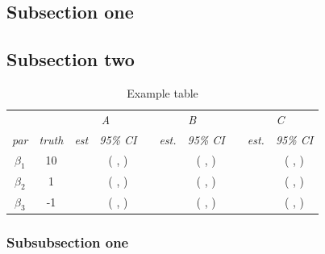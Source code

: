 \documentclass[12pt]{article}
\begin{document}
\subsection{Subsection one}\label{sec:subsimulation1}


\subsection{Subsection two}\label{sec:subsimulation2}

\begin{table}[H]
\begin{center}
\caption{Example table}
\begin{tabular}{cccccccccc}
\hline
&  & \multicolumn{2}{c}{\emph{A}} && \multicolumn{2}{c}{\emph{B}} & &\multicolumn{2}{c}{\emph{C}} \\
\cline{3-4}\cline{6-7}\cline{9-10}
\emph{par}& \emph{truth}& \emph{est}    & \emph{95\% CI} & & \emph{est.}    & \emph{95\% CI}  && \emph{est.} & \emph{95\% CI}\\
\hline
$\beta_1$ & 10 &   &( , )& &  & ( , )& &  &( , )\\
$\beta_2$ & 1 & &( ,  ) & &  & ( , )& &  &( , )\\
$\beta_3$ & -1 &  &( ,  ) & &  & ( , )& & &( , )\\
\hline
\end{tabular}
\end{center}
\end{table}




\subsubsection{Subsubsection one}\label{sec:subsimulation2-1}
\end{document}
